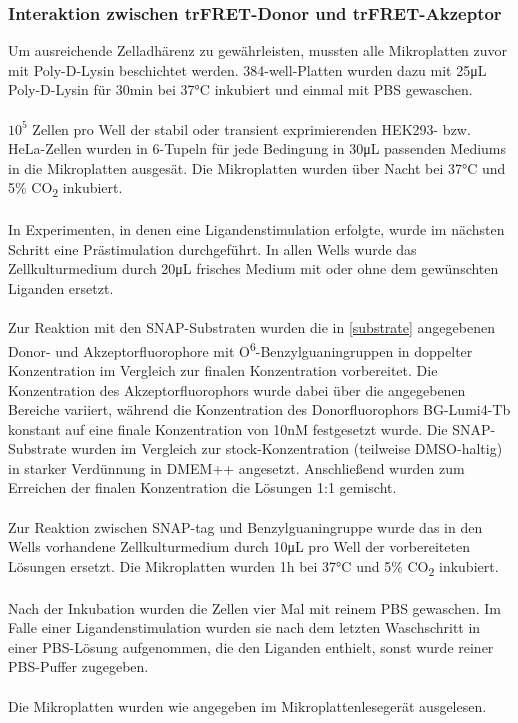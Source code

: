 \subsubsection{Interaktion zwischen trFRET-Donor und trFRET-Akzeptor}\label{interaktion}

Um ausreichende Zelladhärenz zu gewährleisten, mussten alle Mikroplatten zuvor mit Poly-D-Lysin beschichtet werden. 384-well-Platten wurden dazu mit 25\si{\micro\liter} Poly-D-Lysin für 30\si{\minute} bei 37\si{\celsius} inkubiert und einmal mit PBS gewaschen.
\\ \\
$10^5$ Zellen pro Well der stabil oder transient exprimierenden HEK293- bzw. HeLa-Zellen wurden in 6-Tupeln für jede Bedingung in 30\si{\micro\liter} passenden Mediums in die Mikroplatten ausgesät. Die Mikroplatten wurden über Nacht bei 37\si{\celsius} und 5\% CO\textsubscript{2} inkubiert.
\\ \\
In Experimenten, in denen eine Ligandenstimulation erfolgte, wurde im nächsten Schritt eine Prästimulation durchgeführt. In allen Wells wurde das Zellkulturmedium durch 20\si{\micro\liter} frisches Medium mit oder ohne dem gewünschten Liganden ersetzt.
\\ \\
Zur Reaktion mit den SNAP-Substraten wurden die in \ref{substrate} angegebenen Donor- und Akzeptorfluorophore mit O\textsuperscript{6}-Benzylguaningruppen in doppelter Konzentration im Vergleich zur finalen Konzentration vorbereitet. Die Konzentration des Akzeptorfluorophors wurde dabei über die angegebenen Bereiche variiert, während die Konzentration des Donorfluorophors BG-Lumi4-Tb konstant auf eine finale Konzentration von 10\si{\nano M} festgesetzt wurde. Die SNAP-Substrate wurden im Vergleich zur stock-Konzentration (teilweise DMSO-haltig) in starker Verdünnung in DMEM++ angesetzt. Anschließend wurden zum Erreichen der finalen Konzentration die Lösungen 1:1 gemischt.
\\ \\  
Zur Reaktion zwischen SNAP-tag und Benzylguaningruppe wurde das in den Wells vorhandene Zellkulturmedium durch 10\si{\micro\liter} pro Well der vorbereiteten Lösungen ersetzt. Die Mikroplatten wurden 1\si{\hour} bei 37\si{\celsius} und 5\% CO\textsubscript{2} inkubiert.
\\ \\
Nach der Inkubation wurden die Zellen vier Mal mit reinem PBS gewaschen. Im Falle einer Ligandenstimulation wurden sie nach dem letzten Waschschritt in einer PBS-Lösung aufgenommen, die den Liganden enthielt, sonst wurde reiner PBS-Puffer zugegeben.
\\ \\
Die Mikroplatten wurden wie angegeben im Mikroplattenlesegerät ausgelesen.

